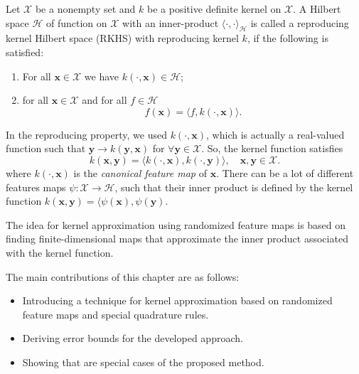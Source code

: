 \begin{definition}
Let $\mathcal{X}$ be a nonempty set and $k$ be a positive definite kernel on $\mathcal{X}$.
A Hilbert space $\mathcal{H}$ of function on $\mathcal{X}$ with an inner-product
$\langle \cdot, \cdot \rangle_{\mathcal{H}}$ is called a reproducing kernel
Hilbert space (RKHS) with reproducing kernel $k$, if the following is satisfied:
    \begin{enumerate}
        \item For all $\mathbf{x} \in \mathcal{X}$ we have
        $k(\cdot, \mathbf{x}) \in \mathcal{H}$;
        \item for all $\mathbf{x} \in \mathcal{X}$ and for all $f\in \mathcal{H}$
        \[
            f(\mathbf{x}) = \langle f, k(\cdot, \mathbf{x}) \rangle
            \tag*{Reproducing property}.
        \]
    \end{enumerate}
\end{definition}
In the reproducing property, we used $k(\cdot, \mathbf{x})$, which is actually
a real-valued function such that $\mathbf{y} \rightarrow k(\mathbf{y, x})$
for $\forall \mathbf{y} \in \mathcal{X}$.
So, the kernel function satisfies
\[
    k(\mathbf{x, y}) = \langle k(\cdot, \mathbf{x}), k(\cdot, \mathbf{y}) \rangle,
    \quad \mathbf{x, y} \in \mathcal{X}.
\]
where $k(\cdot, \mathbf{x})$ is the {\em canonical feature map} of $\mathbf{x}$.
There can be a lot of different features maps
$\psi \colon \mathcal{X} \rightarrow \mathcal{H}$, such that their inner product is defined
by the kernel function $k(\mathbf{x, y}) = \langle \psi(\mathbf{x}), \psi(\mathbf{y})$.

The idea for kernel approximation using randomized feature maps is based
on finding finite-dimensional maps that approximate the inner product associated
with the kernel function.

The main contributions of this chapter are as follows:
\begin{itemize}
    \item Introducing a technique for kernel approximation based on randomized feature maps
    and special quadrature rules.
    \item Deriving error bounds for the developed approach.
    \item Showing that \citep{rahimi2008random,felix2016orthogonal} are special cases of the
    proposed method.
\end{itemize}




